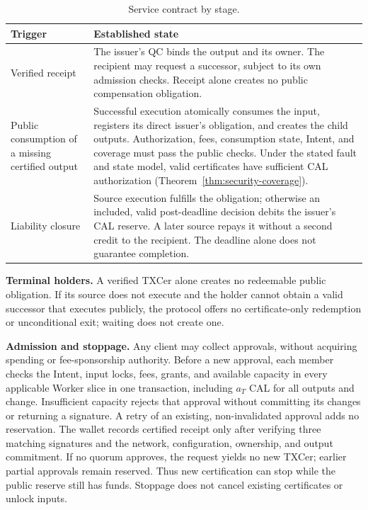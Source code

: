 \begin{table}[!t]
\caption{Service contract by stage.}
\label{tab:model-contract}
\centering\small
\begin{tabular}{@{}>{\raggedright\arraybackslash}p{}>{\raggedright\arraybackslash}p{}@{}}
\toprule
Trigger & Established state \\
\midrule
Verified receipt &
The issuer's QC binds the output and its owner. The recipient may
request a successor, subject to its own admission checks. Receipt
alone creates no public compensation obligation. \\
Public consumption of a missing certified output &
Successful execution atomically consumes the input, registers its
direct issuer's obligation, and creates the child outputs.
Authorization, fees, consumption state, Intent, and coverage must pass the
public checks. Under the stated fault and state model, valid certificates have sufficient CAL authorization (Theorem~\ref{thm:security-coverage}). \\
Liability closure &
Source execution fulfills the obligation; otherwise an included,
valid post-deadline decision debits the issuer's CAL reserve.
A later source repays it without a second credit to the recipient.
The deadline alone does not guarantee completion. \\
\bottomrule
\end{tabular}
\end{table}

\noindent\textbf{Terminal holders.}
A verified TXCer alone creates no redeemable public obligation. If its source
does not execute and the holder cannot obtain a valid successor that executes
publicly, the protocol offers no certificate-only redemption or unconditional exit;
waiting does not create one.

\noindent\textbf{Admission and stoppage.}
Any client may collect approvals, without acquiring spending or
fee-sponsorship authority. Before a new approval, each member checks
the Intent, input locks, fees, grants, and available capacity in every
applicable Worker slice in one transaction, including $a_T$ CAL for all outputs and change. Insufficient capacity
rejects that approval without committing its changes or returning a
signature. A retry of an existing, non-invalidated approval adds no
reservation. The wallet records certified receipt only after verifying
three matching signatures and the network, configuration, ownership,
and output commitment. If no quorum approves, the request yields no
new TXCer; earlier partial approvals remain reserved. Thus new
certification can stop while the public reserve still has funds.
Stoppage does not cancel existing certificates or unlock inputs.

